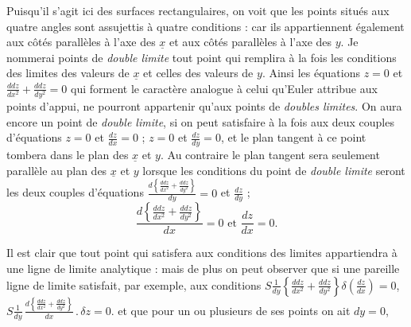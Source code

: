 \documentclass[11pt,a4paper]{article}
\begin{document}
Puisqu'il s'agit ici des surfaces rectangulaires, on voit que les points
situés aux quatre angles sont assujettis à quatre conditions : car ils
appartiennent également aux côtés parallèles à l'axe des $\underline{x}$ et aux
côtés parallèles à l'axe des $y$. Je nommerai points de \emph{double
limite} tout point qui remplira à la fois les conditions des limites
des valeurs de $\underline{x}$ et celles des valeurs de $y$. Ainsi les équations
$z=0$ et $\frac{ddz}{dx^2}+\frac{ddz}{dy^2}=0$ qui forment le caractère analogue à
celui qu'Euler attribue aux points d'appui, ne pourront appartenir
qu'aux points de \emph{doubles limites}. On aura encore un point de
\emph{double limite}, si on peut satisfaire à la fois aux deux couples
d'équations $z=0$ et $\frac{dz}{dx}=0$ ; $z=0$ et $\frac{dz}{dy}=0$, et le plan
tangent à ce point tombera dans le plan des $\underline{x}$ et $y$. Au contraire
le plan tangent sera seulement parallèle au plan des $\underline{x}$ et $y$
lorsque les conditions du point de \emph{double limite} seront les deux
couples d'équations $\frac{d\left\{\frac{ddz}{dx^2}+\frac{ddz}{dy^2}\right\}}{dy}=0$ et $\frac{dz}{dy}$ ;
\[ \frac{d\left\{\frac{ddz}{dx^2}+\frac{ddz}{dy^2}\right\}}{dx}=0 \text{ et } \frac{dz}{dx}=0. \]

Il est clair que tout point qui satisfera aux conditions des
limites appartiendra à une ligne de limite analytique : mais de plus
on peut observer que si une pareille ligne de limite satisfait, par exemple,
aux conditions $S\frac{1}{dy}\left\{\frac{ddz}{dx^2}+\frac{ddz}{dy^2}\right\}\delta\!\left(\frac{dz}{dx}\right)=0$, $S\frac{1}{dy}\,\frac{d\left\{\frac{ddz}{dx^2}+\frac{ddz}{dy^2}\right\}}{dx}\,.\,\delta z=0$.
et que pour un ou plusieurs de ses points on ait $dy=0$,


\end{document}

